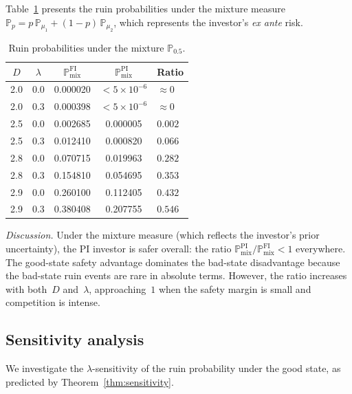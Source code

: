 \documentclass[12pt]{article}
\theoremstyle{remark}
\theoremstyle{definition}
\newcommand{\Prob}{\mathbb{P}}
\newcommand{\FI}{\mathrm{FI}}
\newcommand{\PI}{\mathrm{PI}}
\begin{document}
\medskip
Table~\ref{tab:mixture} presents the ruin probabilities under the
mixture measure $\Prob_{p} = p\,\Prob_{\mu_1} + (1-p)\,\Prob_{\mu_2}$,
which represents the investor's \emph{ex ante} risk.

\begin{table}[H]
\centering
\caption{Ruin probabilities under the mixture $\Prob_{0.5}$.}
\label{tab:mixture}
\smallskip
\begin{tabular}{ccccl}
\toprule
$D$ & $\lambda$ & $\Prob_{\mathrm{mix}}^{\FI}$ & $\Prob_{\mathrm{mix}}^{\PI}$ & Ratio \\
\midrule
2.0 & 0.0 & 0.000020 & ${<}5{\times}10^{-6}$ & $\approx 0$ \\
2.0 & 0.3 & 0.000398 & ${<}5{\times}10^{-6}$ & $\approx 0$ \\
\midrule
2.5 & 0.0 & 0.002685 & 0.000005 & $0.002$ \\
2.5 & 0.3 & 0.012410 & 0.000820 & $0.066$ \\
\midrule
2.8 & 0.0 & 0.070715 & 0.019963 & $0.282$ \\
2.8 & 0.3 & 0.154810 & 0.054695 & $0.353$ \\
\midrule
2.9 & 0.0 & 0.260100 & 0.112405 & $0.432$ \\
2.9 & 0.3 & 0.380408 & 0.207755 & $0.546$ \\
\bottomrule
\end{tabular}
\end{table}

\emph{Discussion.}
Under the mixture measure (which reflects the investor's prior
uncertainty), the PI investor is safer overall: the ratio
$\Prob_{\mathrm{mix}}^{\PI}/\Prob_{\mathrm{mix}}^{\FI} < 1$
everywhere.
The good-state safety advantage dominates the bad-state disadvantage
because the bad-state ruin events are rare in absolute terms.
However, the ratio increases with both~$D$ and~$\lambda$,
approaching~$1$ when the safety margin is small and competition
is intense.


\subsection{Sensitivity analysis}\label{sec:num_sensitivity}

We investigate the $\lambda$-sensitivity of the ruin probability under
the good state, as predicted by Theorem~\ref{thm:sensitivity}.
\end{document}
